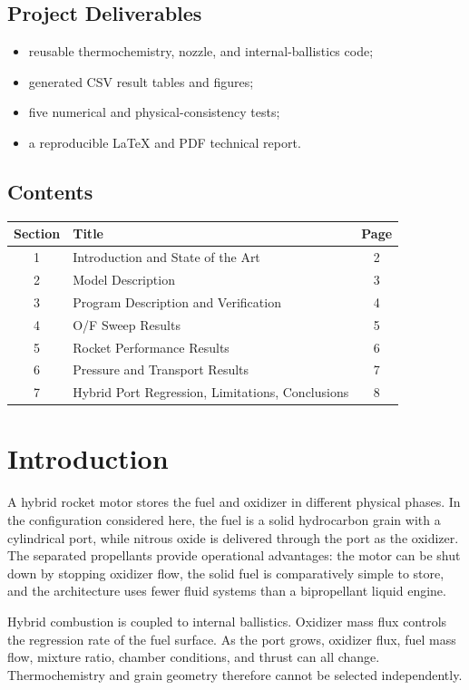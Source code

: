 \documentclass[10pt,a4paper]{article}
\begin{document}
\subsection*{Project Deliverables}
\begin{itemize}
\item reusable thermochemistry, nozzle, and internal-ballistics code;
\item generated CSV result tables and figures;
\item five numerical and physical-consistency tests;
\item a reproducible LaTeX and PDF technical report.
\end{itemize}

\subsection*{Contents}
\begin{tabular}{clc}
\toprule
Section & Title & Page \\
\midrule
1 & Introduction and State of the Art & 2 \\
2 & Model Description & 3 \\
3 & Program Description and Verification & 4 \\
4 & O/F Sweep Results & 5 \\
5 & Rocket Performance Results & 6 \\
6 & Pressure and Transport Results & 7 \\
7 & Hybrid Port Regression, Limitations, Conclusions & 8 \\
\bottomrule
\end{tabular}
\newpage

\section{Introduction}
A hybrid rocket motor stores the fuel and oxidizer in different physical phases. In the configuration considered here, the fuel is a solid hydrocarbon grain with a cylindrical port, while nitrous oxide is delivered through the port as the oxidizer. The separated propellants provide operational advantages: the motor can be shut down by stopping oxidizer flow, the solid fuel is comparatively simple to store, and the architecture uses fewer fluid systems than a bipropellant liquid engine.

Hybrid combustion is coupled to internal ballistics. Oxidizer mass flux controls the regression rate of the fuel surface. As the port grows, oxidizer flux, fuel mass flow, mixture ratio, chamber conditions, and thrust can all change. Thermochemistry and grain geometry therefore cannot be selected independently.
\end{document}
